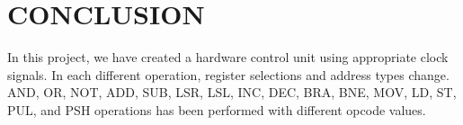 \documentclass[pdftex,12pt,a4paper]{article}
\begin{document}
\section{CONCLUSION}
In this project, we have created a hardware control unit using appropriate clock signals. In each different operation, register selections and address types change. AND, OR, NOT, ADD, SUB, LSR, LSL, INC, DEC, BRA, BNE, MOV, LD, ST, PUL, and PSH operations has been performed with different opcode values.

\newpage
{}



\end{document}
